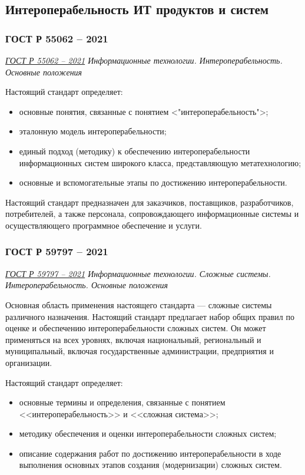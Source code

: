 \subsection{Интероперабельность ИТ продуктов и систем}

\subsubsection{ГОСТ Р 55062 -- 2021}

\emph{\href{https://docs.cntd.ru/document/1200181340}{ГОСТ Р 55062 -- 2021}
Информационные технологии. Интероперабельность. Основные положения
}

Настоящий стандарт определяет:

\begin{itemize}
	\item основные понятия, связанные с понятием <"интероперабельность">;
	\item эталонную модель интероперабельности;
	\item единый подход (методику) к обеспечению интероперабельности
		информационных систем широкого класса, представляющую метатехнологию;
	\item основные и вспомогательные этапы по достижению интероперабельности.
\end{itemize}

Настоящий стандарт предназначен для заказчиков, поставщиков, разработчиков,
потребителей, а также персонала, сопровождающего информационные системы
и осуществляющего программное обеспечение и услуги.

\subsubsection{ГОСТ Р 59797 -- 2021}

\emph{\href{https://docs.cntd.ru/document/1200181353}{ГОСТ Р 59797 -- 2021}
Информационные технологии. Сложные системы. Интероперабельность. Основные положения
}

Основная область применения настоящего стандарта
--- сложные системы различного назначения.
Настоящий стандарт предлагает набор общих правил по оценке
и обеспечению интероперабельности сложных систем.
Он может применяться на всех уровнях, включая национальный,
региональный и муниципальный,
включая государственные администрации, предприятия и организации.

Настоящий стандарт определяет:

\begin{itemize}
	\item основные термины и определения,
		связанные с понятием <<интероперабельность>> и <<сложная система>>;
	\item методику обеспечения
		и оценки интероперабельности сложных систем;
	\item описание содержания работ
		по достижению интероперабельности в ходе выполнения основных
		этапов создания (модернизации) сложных систем.
\end{itemize}

